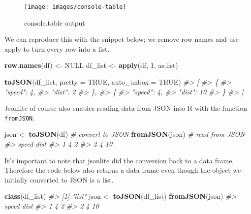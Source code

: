 \documentclass[10pt,]{krantz}
\makeatletter
\newenvironment{Shaded}{\begin{snugshade}}{\end{snugshade}}
\newcommand{\CommentTok}[1]{\textcolor[rgb]{0.37,0.37,0.37}{\textit{#1}}}
\newcommand{\DataTypeTok}[1]{\textcolor[rgb]{0.27,0.27,0.27}{#1}}
\newcommand{\DecValTok}[1]{\textcolor[rgb]{0.06,0.06,0.06}{#1}}
\newcommand{\KeywordTok}[1]{\textcolor[rgb]{0.27,0.27,0.27}{\textbf{#1}}}
\newcommand{\NormalTok}[1]{#1}
\newcommand{\OtherTok}[1]{\textcolor[rgb]{0.37,0.37,0.37}{#1}}
\newcommand{\StringTok}[1]{\textcolor[rgb]{0.5,0.5,0.5}{#1}}
\newenvironment{kframe}{%
\medskip{}
\setlength{\fboxsep}{.8em}
 \def\at@end@of@kframe{}%
 \ifinner\ifhmode%
  \def\at@end@of@kframe{\end{minipage}}%
  \begin{minipage}{\columnwidth}%
 \fi\fi%
 \def\FrameCommand##1{\hskip\@totalleftmargin \hskip-\fboxsep
 \colorbox{shadecolor}{##1}\hskip-\fboxsep
     \hskip-\linewidth \hskip-\@totalleftmargin \hskip\columnwidth}%
 \MakeFramed {\advance\hsize-\width
   \@totalleftmargin\z@ \linewidth\hsize
   \@setminipage}}%
 {\par\unskip\endMakeFramed%
 \at@end@of@kframe}
\renewenvironment{Shaded}{\begin{kframe}}{\end{kframe}}
\makeatother
\begin{document}
\begin{figure}[H]

{\centering \texttt{[image: images/console-table]} 

}

\caption{console.table output}\label{fig:console-table}
\end{figure}

We can reproduce this with the snippet below; we remove row names and use apply to turn every row into a list.

\begin{Shaded}
\begin{Highlighting}[]
\KeywordTok{row.names}\NormalTok{(df) <-}\StringTok{ }\OtherTok{NULL}
\NormalTok{df_list <-}\StringTok{ }\KeywordTok{apply}\NormalTok{(df, }\DecValTok{1}\NormalTok{, as.list)}

\KeywordTok{toJSON}\NormalTok{(df_list, }\DataTypeTok{pretty =} \OtherTok{TRUE}\NormalTok{, }\DataTypeTok{auto_unbox =} \OtherTok{TRUE}\NormalTok{)}
\CommentTok{#> [}
\CommentTok{#>   \{}
\CommentTok{#>     "speed": 4,}
\CommentTok{#>     "dist": 2}
\CommentTok{#>   \},}
\CommentTok{#>   \{}
\CommentTok{#>     "speed": 4,}
\CommentTok{#>     "dist": 10}
\CommentTok{#>   \}}
\CommentTok{#> ]}
\end{Highlighting}
\end{Shaded}

Jsonlite of course also enables reading data from JSON into R with the function \texttt{fromJSON}.

\begin{Shaded}
\begin{Highlighting}[]
\NormalTok{json <-}\StringTok{ }\KeywordTok{toJSON}\NormalTok{(df) }\CommentTok{# convert to JSON}
\KeywordTok{fromJSON}\NormalTok{(json) }\CommentTok{# read from JSON}
\CommentTok{#>   speed dist}
\CommentTok{#> 1     4    2}
\CommentTok{#> 2     4   10}
\end{Highlighting}
\end{Shaded}

It's important to note that jsonlite did the conversion back to a data frame. Therefore the code below also returns a data frame even though the object we initially converted to JSON is a list.

\begin{Shaded}
\begin{Highlighting}[]
\KeywordTok{class}\NormalTok{(df_list)}
\CommentTok{#> [1] "list"}
\NormalTok{json <-}\StringTok{ }\KeywordTok{toJSON}\NormalTok{(df_list)}
\KeywordTok{fromJSON}\NormalTok{(json)}
\CommentTok{#>   speed dist}
\CommentTok{#> 1     4    2}
\CommentTok{#> 2     4   10}
\end{Highlighting}
\end{Shaded}
\end{document}
